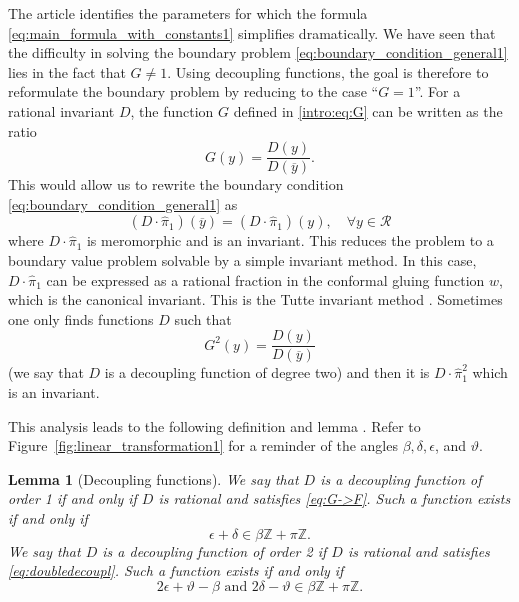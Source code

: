 \documentclass[11pt]{article}
\newcommand\citeS[1]{\cite{#1}}
\newcommand{\R}{\mathcal{R}}
\newcommand{\thetadeux}{y}
\newcommand{\bigthetaun}{X}
\newcommand{\G}{\mathcal{D}_\mathcal{R}}
\newtheorem{lemm}[thm]{Lemma}
\theoremstyle{definition}
\begin{document}
The article \citeS{franceschi_bousquet_melou_price_hardouin_raschel_stationary_2023} identifies the parameters for which the formula \eqref{eq:main_formula_with_constants1} simplifies dramatically. 
We have seen that the difficulty in solving the boundary problem \eqref{eq:boundary_condition_general1} lies in the fact that $G\neq1$. Using decoupling functions, the goal is therefore to reformulate the boundary problem by reducing to the case ``$G=1$''.
For a rational invariant $D$, the function $G$ defined in \eqref{intro:eq:G} can be written as the ratio
\begin{equation}
\label{eq:G->F}
     G(\thetadeux) = \frac{D(\thetadeux)}{D(\overline{\thetadeux})}.
\end{equation}
This would allow us to rewrite the boundary condition \eqref{eq:boundary_condition_general1} as
\begin{equation*}
     (D\cdot\widehat \pi_1)(\overline{\thetadeux})=(D\cdot\widehat \pi_1)({\thetadeux}),
     \quad 
     \forall y\in\R
\end{equation*}
where $D\cdot\widehat\pi_1$ is meromorphic and is an invariant. This reduces the problem to a boundary value problem solvable by a simple invariant method. In this case, $D\cdot\widehat\pi_1$ can be expressed as a rational fraction in the conformal gluing function $w$, which is the canonical invariant. This is the Tutte invariant method . Sometimes one only finds functions $D$ such that
\begin{equation}
\label{eq:doubledecoupl}
     G^2(\thetadeux) = \frac{D(\thetadeux)}{D(\overline{\thetadeux})}
\end{equation}
(we say that $D$ is a decoupling function of degree two) and then it is $D\cdot\widehat\pi_1^2$ which is an invariant.

This analysis leads to the following definition and lemma \citeS{franceschi_bousquet_melou_price_hardouin_raschel_stationary_2023}. Refer to Figure~\ref{fig:linear_transformation1} for a reminder of the angles $\beta,\delta,\epsilon$, and $\vartheta$.
\begin{lemm}[Decoupling functions]
\label{def:decoupling_function}
We say that $D$ is a decoupling function of order 1 if and only if $D$ is rational and satisfies \eqref{eq:G->F}. Such a function exists if and only if
\begin{equation}
\epsilon+\delta\in \beta \mathbb{Z}+ \pi\mathbb{Z}.
\label{cnsdecou}
\end{equation}
We say that $D$ is a decoupling function of order 2 if $D$ is rational and satisfies \eqref{eq:doubledecoupl}. Such a function exists if and only if
\begin{equation}
2\epsilon+\vartheta-\beta \text{ and } 2\delta-\vartheta \in \beta \mathbb{Z}+ \pi\mathbb{Z}.
\label{cns2decou}
\end{equation}
\end{lemm}
\end{document}
